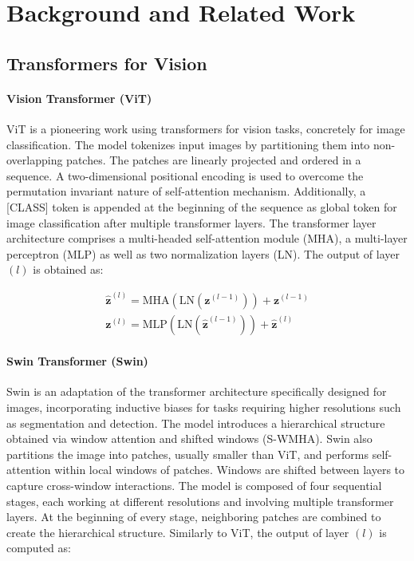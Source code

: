 \section{Background and Related Work}
\label{sec:related}

\subsection{Transformers for Vision}
\label{sec:related:transformers}

\paragraph{Vision Transformer (ViT) \cite{dosovitskiy2020vit}} ViT is a pioneering work using transformers for vision tasks, concretely for image classification. The model tokenizes input images by partitioning them into non-overlapping patches. The patches are linearly projected and ordered in a sequence. A two-dimensional positional encoding is used to overcome the permutation invariant nature of self-attention mechanism. Additionally, a [CLASS] token is appended at the beginning of the sequence as global token for image classification after multiple transformer layers. The transformer layer architecture comprises a multi-headed self-attention module (MHA), a multi-layer perceptron (MLP) as well as two normalization layers (LN). The output of layer $(l)$ is obtained as:

\begin{align}
    \label{eq:vit}
    \mathbf{\hat{z}}^{(l)} = \text{MHA}( \text{LN}(\mathbf{z}^{(l-1)}) ) + \mathbf{z}^{(l-1)} \\
    \mathbf{z}^{(l)} = \text{MLP}( \text{LN}(\mathbf{\hat{z}}^{(l-1)}) ) + \mathbf{\hat{z}}^{(l)}
\end{align}

\paragraph{Swin Transformer (Swin) \cite{liu2021swin}} Swin is an adaptation of the transformer architecture specifically designed for images, incorporating inductive biases for tasks requiring higher resolutions such as segmentation and detection. The model introduces a hierarchical structure obtained via window attention and shifted windows (S-WMHA). Swin also partitions the image into patches, usually smaller than ViT, and performs self-attention within local windows of patches. Windows are shifted between layers to capture cross-window interactions. The model is composed of four sequential stages, each working at different resolutions and involving multiple transformer layers. At the beginning of every stage, neighboring patches are combined to create the hierarchical structure. Similarly to ViT, the output of layer $(l)$ is computed as:

